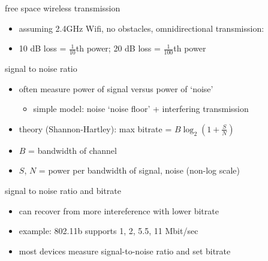 \begin{frame}{free space wireless transmission}
\begin{itemize}
\item assuming 2.4GHz Wifi, no obstacles, omnidirectional transmission:
\item 10 dB loss = $\frac{1}{10}$th power; 20 dB loss = $\frac{1}{100}$th power
\end{itemize}
\end{frame}

\begin{frame}{signal to noise ratio}
    \begin{itemize}
    \item often measure power of signal versus power of `noise'
        \begin{itemize}
        \item simple model: noise `noise floor' + interfering transmission
        \end{itemize}
    \vspace{.5cm}
    \item theory (Shannon-Hartley): max bitrate = $B\log_2\left(1+\frac{S}{N}\right)$
    \item $B$ = bandwidth of channel
    \item $S$, $N$ = power per bandwidth of signal, noise (non-log scale)
    \end{itemize}
\end{frame}

\begin{frame}{signal to noise ratio and bitrate}
    \begin{itemize}
    \item can recover from more intereference with lower bitrate
    \vspace{.5cm}
    \item example: 802.11b supports 1, 2, 5.5, 11 Mbit/sec
    \item most devices measure signal-to-noise ratio and set bitrate
    \end{itemize}
\end{frame}


